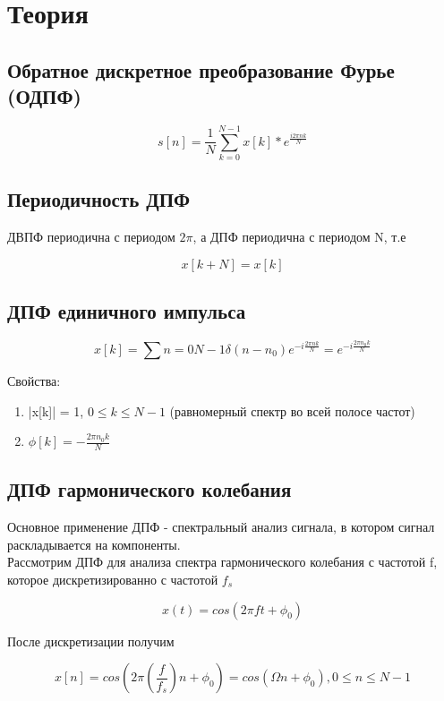 \chapter{Теория}
\label{ch:intro}

\section{Обратное дискретное преобразование Фурье (ОДПФ)}

$$\boxed{s[n] = \frac{1}{N}\sum_{k=0}^{N-1}x[k]*e^{\frac{i2\pi nk}{N}}}$$

\section{Периодичность ДПФ}

ДВПФ периодична с периодом $2\pi$, а ДПФ периодична с периодом N, т.е

$$x[k+N] = x[k]$$

\section{ДПФ единичного импульса}

$$\boxed{x[k] = \sum{n=0}{N-1}\delta(n-n_0)e^{-i\frac{2\pi nk}{N}} = e^{-i\frac{2\pi n_0k}{N}}}$$

Свойства:

\begin{enumerate}
    \item |x[k]| = 1, $0 \le k \le N-1$ (равномерный спектр во всей полосе частот)
    \item $\phi[k] = -\frac{2\pi n_0k}{N}$
\end{enumerate}

\section{ДПФ гармонического колебания}
Основное применение ДПФ - спектральный анализ сигнала, в котором сигнал раскладывается на компоненты.\\

Рассмотрим ДПФ для анализа спектра гармонического колебания с частотой f, которое дискретизированно с частотой $f_s$

$$x(t) = cos(2\pi ft + \phi_0)$$

После дискретизации получим

$$x[n] = cos(2\pi(\frac{f}{f_s})n+\phi_0) = cos(\Omega n+\phi_0), 0 \le n \le N-1$$

